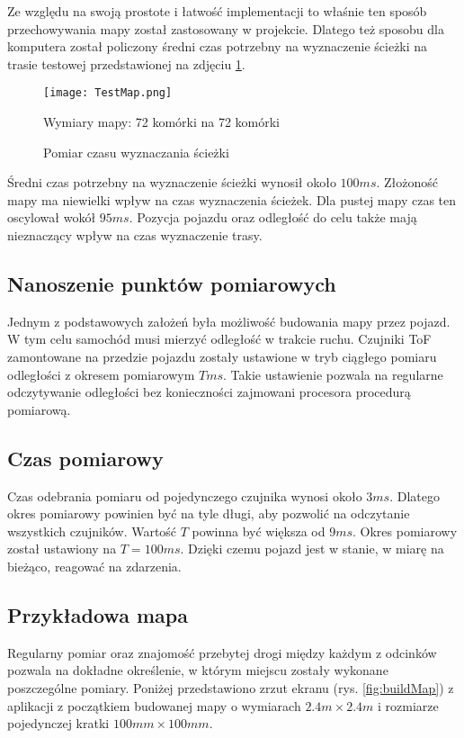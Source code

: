             Ze względu na swoją prostote i łatwość implementacji to właśnie ten sposób przechowywania mapy został zastosowany w projekcie.
            Dlatego też sposobu dla komputera został policzony średni czas potrzebny na wyznaczenie ścieżki na trasie testowej przedstawionej na zdjęciu \ref{fig:pathFindingTime}.
            \begin{figure}
                \centering
                \texttt{[image: TestMap.png]}
                \caption{Pomiar czasu wyznaczania ścieżki}
                Wymiary mapy: 72 komórki na 72 komórki
                \label{fig:pathFindingTime}
            \end{figure}

            Średni czas potrzebny na wyznaczenie ścieżki wynosił około $100ms$.
            Złożoność mapy ma niewielki wpływ na czas wyznaczenia ścieżek.
            Dla pustej mapy czas ten oscylował wokół $95ms$.
            Pozycja pojazdu oraz odległość do celu także mają nieznaczący wpływ na czas wyznaczenie trasy.

    \subsection{Nanoszenie punktów pomiarowych}
        Jednym z podstawowych założeń była możliwość budowania mapy przez pojazd.
        W tym celu samochód musi mierzyć odległość w trakcie ruchu.
        Czujniki ToF zamontowane na przedzie pojazdu zostały ustawione w tryb ciągłego pomiaru odległości z okresem pomiarowym $T ms$.
        Takie ustawienie pozwala na regularne odczytywanie odległości bez konieczności zajmowani procesora procedurą pomiarową.

        \subsection{Czas pomiarowy}
            Czas odebrania pomiaru od pojedynczego czujnika wynosi około $3ms$.
            Dlatego okres pomiarowy powinien być na tyle długi, aby pozwolić na odczytanie wszystkich czujników.
            Wartość $T$ powinna być większa od $9ms$.
            Okres pomiarowy został ustawiony na $T = 100ms$.
            Dzięki czemu pojazd jest w stanie, w miarę na bieżąco, reagować na zdarzenia.

        \subsection{Przykładowa mapa}
            Regularny pomiar oraz znajomość przebytej drogi między każdym z odcinków pozwala na dokładne określenie, w którym miejscu zostały wykonane poszczególne pomiary.
            Poniżej przedstawiono zrzut ekranu (rys. \ref{fig:buildMap}) z aplikacji z początkiem budowanej mapy o wymiarach $ 2.4m \times 2.4m$ i rozmiarze pojedynczej kratki $100mm \times 100mm$.

